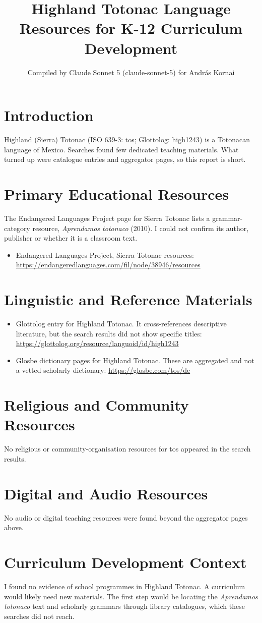 \documentclass[12pt]{article}
\title{Highland Totonac Language Resources for K-12 Curriculum Development}
\author{Compiled by Claude Sonnet 5 (claude-sonnet-5) for Andr\'as Kornai}
\date{}
\begin{document}
\maketitle

\section{Introduction}
Highland (Sierra) Totonac (ISO 639-3: tos; Glottolog: high1243) is a Totonacan language of Mexico. Searches found few dedicated teaching materials. What turned up were catalogue entries and aggregator pages, so this report is short.

\section{Primary Educational Resources}
The Endangered Languages Project page for Sierra Totonac lists a grammar-category resource, \emph{Aprendamos totonaco} (2010). I could not confirm its author, publisher or whether it is a classroom text.
\begin{itemize}
\item Endangered Languages Project, Sierra Totonac resources: \url{https://endangeredlanguages.com/fil/node/38946/resources}
\end{itemize}

\section{Linguistic and Reference Materials}
\begin{itemize}
\item Glottolog entry for Highland Totonac. It cross-references descriptive literature, but the search results did not show specific titles: \url{https://glottolog.org/resource/languoid/id/high1243}
\item Glosbe dictionary pages for Highland Totonac. These are aggregated and not a vetted scholarly dictionary: \url{https://glosbe.com/tos/de}
\end{itemize}

\section{Religious and Community Resources}
No religious or community-organisation resources for tos appeared in the search results.

\section{Digital and Audio Resources}
No audio or digital teaching resources were found beyond the aggregator pages above.

\section{Curriculum Development Context}
I found no evidence of school programmes in Highland Totonac. A curriculum would likely need new materials. The first step would be locating the \emph{Aprendamos totonaco} text and scholarly grammars through library catalogues, which these searches did not reach.
\end{document}
